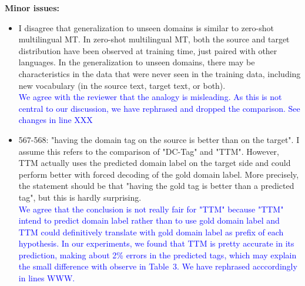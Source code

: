 \documentclass[12pt,times,a4paper,twoside]{article}
\newcommand{\fyTodo}[1]{\Todo[FY:]{\textcolor{orange}{#1}}}
\theoremstyle{definition}
\begin{document}
\noindent\textbf{Minor issues:}
\begin{itemize}
\item I disagree that generalization to unseen domains is similar to zero-shot multilingual MT. In zero-shot multilingual MT, both the source and target distribution have been observed at training time, just paired with other languages. In the generalization to unseen domains, there may be characteristics in the data that were never seen in the training data, including new vocabulary (in the source text, target text, or both).
  \\
  \textcolor{blue}{We agree with the reviewer that the analogy is misleading. As this is not central to our discussion, we have rephrased and dropped the comparison. See changes in line XXX}\fyTodo{Changes line in.}
\item 567-568: "having the domain tag on the source is better than on the target". I assume this refers to the comparison of "DC-Tag" and "TTM". However, TTM actually uses the predicted domain label on the target side and could perform better with forced decoding of the gold domain label. More precisely, the statement should be that "having the gold tag is better than a predicted tag", but this is hardly surprising.
  \\
  \textcolor{blue}{We agree that the conclusion is not really fair for "TTM" because "TTM" intend to predict domain label rather than to use gold domain label and TTM could definitively translate with gold domain label as prefix of each hypothesis. In our experiments, we found that TTM is pretty accurate in its prediction, making about 2\% errors in the predicted tags, which may explain the small difference with observe in Table~3. We have rephrased acccordingly in lines WWW.}\fyTodo{Add lines}
\end{itemize}
\end{document}
